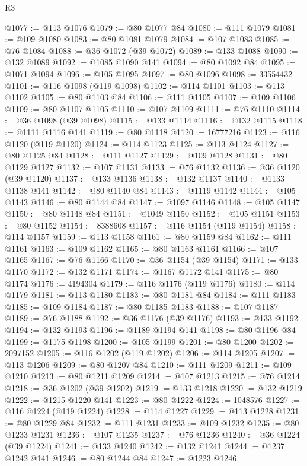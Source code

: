 \begin{lexlean}{R3}
\begin{coremodule}
@1077 := @113 @1076
@1079 := @80 @1077 @84
@1080 := @111 @1079
@1081 := @109 @1080
@1083 := @80 @1081 @1079
@1084 := @107 @1083
@1085 := @76 @1084
@1088 := @36 @1072 (@39 @1072)
@1089 := @133 @1088
@1090 := @132 @1089
@1092 := @1085 @1090 @141
@1094 := @80 @1092 @84
@1095 := @1071 @1094
@1096 := @105 @1095
@1097 := @80 @1096
@1098 := 33554432
@1101 := @116 @1098 (@119 @1098)
@1102 := @114 @1101
@1103 := @113 @1102
@1105 := @80 @1103 @84
@1106 := @111 @1105
@1107 := @109 @1106
@1109 := @80 @1107 @1105
@1110 := @107 @1109
@1111 := @76 @1110
@1114 := @36 @1098 (@39 @1098)
@1115 := @133 @1114
@1116 := @132 @1115
@1118 := @1111 @1116 @141
@1119 := @80 @1118
@1120 := 16777216
@1123 := @116 @1120 (@119 @1120)
@1124 := @114 @1123
@1125 := @113 @1124
@1127 := @80 @1125 @84
@1128 := @111 @1127
@1129 := @109 @1128
@1131 := @80 @1129 @1127
@1132 := @107 @1131
@1133 := @76 @1132
@1136 := @36 @1120 (@39 @1120)
@1137 := @133 @1136
@1138 := @132 @1137
@1140 := @1133 @1138 @141
@1142 := @80 @1140 @84
@1143 := @1119 @1142
@1144 := @105 @1143
@1146 := @80 @1144 @84
@1147 := @1097 @1146
@1148 := @105 @1147
@1150 := @80 @1148 @84
@1151 := @1049 @1150
@1152 := @105 @1151
@1153 := @80 @1152
@1154 := 8388608
@1157 := @116 @1154 (@119 @1154)
@1158 := @114 @1157
@1159 := @113 @1158
@1161 := @80 @1159 @84
@1162 := @111 @1161
@1163 := @109 @1162
@1165 := @80 @1163 @1161
@1166 := @107 @1165
@1167 := @76 @1166
@1170 := @36 @1154 (@39 @1154)
@1171 := @133 @1170
@1172 := @132 @1171
@1174 := @1167 @1172 @141
@1175 := @80 @1174
@1176 := 4194304
@1179 := @116 @1176 (@119 @1176)
@1180 := @114 @1179
@1181 := @113 @1180
@1183 := @80 @1181 @84
@1184 := @111 @1183
@1185 := @109 @1184
@1187 := @80 @1185 @1183
@1188 := @107 @1187
@1189 := @76 @1188
@1192 := @36 @1176 (@39 @1176)
@1193 := @133 @1192
@1194 := @132 @1193
@1196 := @1189 @1194 @141
@1198 := @80 @1196 @84
@1199 := @1175 @1198
@1200 := @105 @1199
@1201 := @80 @1200
@1202 := 2097152
@1205 := @116 @1202 (@119 @1202)
@1206 := @114 @1205
@1207 := @113 @1206
@1209 := @80 @1207 @84
@1210 := @111 @1209
@1211 := @109 @1210
@1213 := @80 @1211 @1209
@1214 := @107 @1213
@1215 := @76 @1214
@1218 := @36 @1202 (@39 @1202)
@1219 := @133 @1218
@1220 := @132 @1219
@1222 := @1215 @1220 @141
@1223 := @80 @1222
@1224 := 1048576
@1227 := @116 @1224 (@119 @1224)
@1228 := @114 @1227
@1229 := @113 @1228
@1231 := @80 @1229 @84
@1232 := @111 @1231
@1233 := @109 @1232
@1235 := @80 @1233 @1231
@1236 := @107 @1235
@1237 := @76 @1236
@1240 := @36 @1224 (@39 @1224)
@1241 := @133 @1240
@1242 := @132 @1241
@1244 := @1237 @1242 @141
@1246 := @80 @1244 @84
@1247 := @1223 @1246

\end{coremodule}
\end{lexlean}
